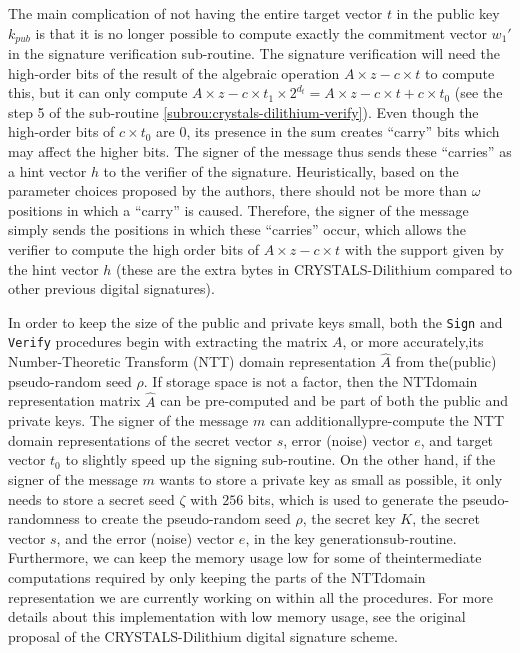 \documentclass[runningheads]{llncs}
\numberwithin{equation}{section}
\begin{document}
    The main complication of not having the entire target vector $t$ in the public key ${k}_{pub}$ is that it is no longer possible to compute exactly the commitment vector ${w}_{1}'$ in the signature verification sub-routine. The signature verification will need the high-order bits of the result of the algebraic operation $A \times z - c \times t$ to compute this, but it can only compute $A \times z - c \times {t}_{1} \times {2}^{{d}_{t}} = A \times z - c \times t + c \times {t}_{0}$  (see the step 5 of the sub-routine \ref{subrou:crystals-dilithium-verify}). Even though the high-order bits of $c \times {t}_{0}$ are $0$, its presence in the sum creates ``carry'' bits which may affect the higher bits. The signer of the message thus sends these ``carries'' as a hint vector $h$ to the verifier of the signature. Heuristically, based on the parameter choices proposed by the authors, there should not be more than $\omega$ positions in which a ``carry'' is caused. Therefore, the signer of the message simply sends the positions in which these ``carries'' occur, which allows the verifier to compute the high order bits of $A \times z - c \times t$ with the support given by the hint vector $h$ (these are the extra bytes in CRYSTALS-Dilithium compared to other previous digital signatures).

    In order to keep the size of the public and private keys small, both the \texttt{Sign} and \texttt{Verify} procedures begin with extracting the matrix $A$, or more accurately,\break its Number-Theoretic Transform (NTT) \cite{agarwal-burrus:number-theoretic-transforms-implement-fast-digital-convolution:1975:06-2024} domain representation $\hat{A}$ from the\break (public) pseudo-random seed $\rho$. If storage space is not a factor, then the NTT\break domain representation matrix $\hat{A}$ can be pre-computed and be part of both the public and private keys. The signer of the message $m$ can additionally\break pre-compute the NTT domain representations of the secret vector $s$, error (noise) vector $e$, and target vector ${t}_{0}$ to slightly speed up the signing sub-routine. On the other hand, if the signer of the message $m$ wants to store a private key as small as possible, it only needs to store a secret seed $\zeta$ with $256$ bits, which is used to generate the pseudo-randomness to create the pseudo-random seed $\rho$, the secret key $K$, the secret vector $s$, and the error (noise) vector $e$, in the key generation\break sub-routine. Furthermore, we can keep the memory usage low for some of the\break intermediate computations required by only keeping the parts of the NTT\break domain representation we are currently working on within all the procedures. For more details about this implementation with low memory usage, see the original proposal of the CRYSTALS-Dilithium digital signature scheme.
\end{document}
